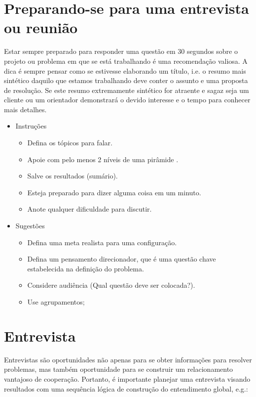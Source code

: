 \section{Preparando-se para uma entrevista ou reunião}
Estar sempre preparado para responder uma questão em 30 segundos sobre o projeto ou problema em que se está trabalhando é uma recomendação valiosa. A dica é sempre pensar como se estivesse elaborando um título, i.e. o resumo mais sintético daquilo que estamos trabalhando deve conter o assunto e uma proposta de resolução. Se este resumo extremamente sintético for atraente e sagaz seja um cliente ou um orientador demonstrará o devido interesse e o tempo para conhecer mais detalhes. 

\begin{itemize}
	\item  Instruções
	\begin{itemize}
		\item    Defina os tópicos para falar.
		\item    Apoie com pelo menos 2 níveis de uma pirâmide .
		\item    Salve os resultados (sumário).
		\item    Esteja preparado para dizer alguma coisa em um minuto.
		\item    Anote qualquer dificuldade para discutir.
	\end{itemize}
	\item  Sugestões
	\begin{itemize}
		\item    Defina uma meta realista para uma configuração.
		\item    Defina um pensamento direcionador, que  é uma questão chave estabelecida na definição do problema.
		\item    Considere audiência (Qual questão deve ser colocada?).
		\item    Use agrupamentos;
	\end{itemize}
\end{itemize}

\section{Entrevista}

Entrevistas são oportunidades não apenas para se obter informações para resolver problemas, mas também oportunidade para se construir um relacionamento vantajoso de cooperação.
Portanto, é importante planejar uma entrevista  visando resultados com uma sequência lógica de construção do entendimento global, e.g.:


